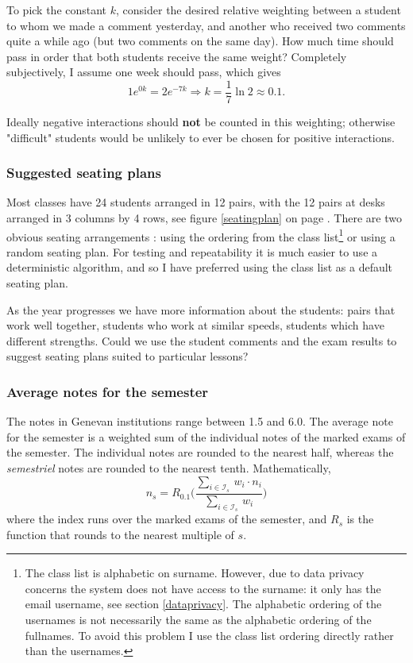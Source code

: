 \documentclass[10pt]{article}
\begin{document}
To pick the constant $k$, consider the desired relative weighting between a student to whom we made a comment yesterday, and another who received two comments quite a while ago (but two comments on the same day). How much time should pass in order that both students receive the same weight? Completely subjectively, I assume one week should pass, which gives
$$1 e^{0k} = 2 e^{-7k} \Rightarrow k = \frac{1}{7} \ln {2}  \approx 0.1.$$ 

Ideally negative interactions should \textbf{not} be counted in this weighting; otherwise "difficult" students would be unlikely to ever be chosen for positive interactions.

\subsubsection{Suggested seating plans}

Most classes have 24 students arranged in 12 pairs, with the 12 pairs at desks arranged in 3 columns by 4 rows, see figure \ref{seatingplan} on page \pageref{seatingplan}. There are two obvious seating arrangements : using the ordering from the class list\footnote{The class list is alphabetic on surname. However, due to data privacy concerns the system does not have access to the surname: it only has the email username, see section \ref{dataprivacy}. The alphabetic ordering of the usernames is not necessarily the same as the alphabetic ordering of the fullnames. To avoid this problem I use the class list ordering directly rather than the usernames.} or using a random seating plan. For testing and repeatability it is much easier to use a deterministic algorithm, and so I have preferred using the class list as a default seating plan.

As the year progresses we have more information about the students: pairs that work well together, students who work at similar speeds, students which have different strengths. Could we use the student comments and the exam results to suggest seating plans suited to particular lessons?

\subsubsection{Average notes for the semester} \label{output_notes}

The notes in Genevan institutions range between 1.5 and 6.0. The average note for the semester is a weighted sum of the individual notes of the marked exams of the semester. The individual notes are rounded to the nearest half, whereas the \emph{semestriel} notes are rounded to the nearest tenth. Mathematically, 
$$ n_s = R_{0.1} \Bigg(\frac{\sum_{i \in \mathcal{I}_s} \, w_i \cdot n_i }{\sum_{i \in \mathcal{I}_s} \, w_i}\Bigg)$$
where the index runs over the marked exams of the semester, and $R_s$ is the function that rounds to the nearest multiple of $s$.
\end{document}
